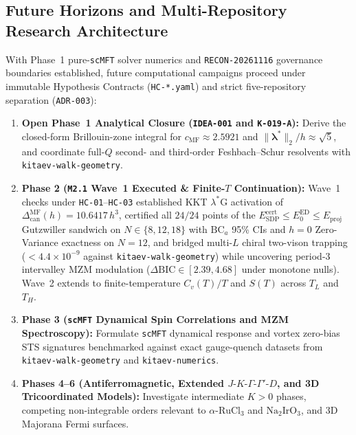 \subsection{Future Horizons and Multi-Repository Research Architecture}
With Phase~1 pure-\texttt{scMFT} solver numerics and \texttt{RECON-20261116} governance boundaries established, future computational campaigns proceed under immutable Hypothesis Contracts (\texttt{HC-*.yaml}) and strict five-repository separation (\texttt{ADR-003}):
\begin{enumerate}
\item \textbf{Open Phase~1 Analytical Closure (\texttt{IDEA-001} and \texttt{K-019-A}):} Derive the closed-form Brillouin-zone integral for $c_{\mathrm{MF}} \approx 2.5921$ and $\|\boldsymbol{\lambda}^*\|_2/h \approx \sqrt{5}$, and coordinate full-$Q$ second- and third-order Feshbach--Schur resolvents with \texttt{kitaev-walk-geometry}.
\item \textbf{Phase 2 (\texttt{M2.1} Wave~1 Executed \& Finite-$T$ Continuation):} Wave~1 checks under \texttt{HC-01}--\texttt{HC-03} established KKT $\lambda^*\mathrm{G}$ activation of $\Delta_{\mathrm{can}}^{\mathrm{MF}}(h) = 10.6417\,h^3$, certified all $24/24$ points of the $E_{\mathrm{SDP}}^{\mathrm{cert}} \le E_0^{\mathrm{ED}} \le E_{\mathrm{proj}}$ Gutzwiller sandwich on $N \in \{8, 12, 18\}$ with $\mathrm{BC}_a$ 95\% CIs and $h=0$ Zero-Variance exactness on $N=12$, and bridged multi-$L$ chiral two-vison trapping ($< 4.4\times 10^{-9}$ against \texttt{kitaev-walk-geometry}) while uncovering period-3 intervalley MZM modulation ($\Delta\mathrm{BIC} \in [2.39, 4.68]$ under monotone nulls). Wave~2 extends to finite-temperature $C_v(T)/T$ and $S(T)$ across $T_L$ and $T_H$.
\item \textbf{Phase 3 (\texttt{scMFT} Dynamical Spin Correlations and MZM Spectroscopy):} Formulate \texttt{scMFT} dynamical response and vortex zero-bias STS signatures benchmarked against exact gauge-quench datasets from \texttt{kitaev-walk-geometry} and \texttt{kitaev-numerics}.
\item \textbf{Phases 4--6 (Antiferromagnetic, Extended $J\text{-}K\text{-}\Gamma\text{-}\Gamma'\text{-}D$, and 3D Tricoordinated Models):} Investigate intermediate $K > 0$ phases, competing non-integrable orders relevant to $\alpha\text{-RuCl}_3$ and $\text{Na}_2\text{IrO}_3$, and 3D Majorana Fermi surfaces.
\end{enumerate}
